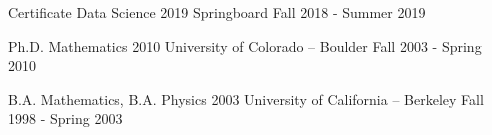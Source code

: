 

\begin{cventries}

  \cventry
    {Certificate Data Science 2019} %
    {Springboard} %
    {} %
    {Fall 2018 - Summer 2019} %
    {
    }
    \vspace{-5mm}

  \cventry
    {Ph.D. Mathematics 2010} %
    {University of Colorado -- Boulder} %
    {} %
    {Fall 2003 - Spring 2010} %
    {
    }
    \vspace{-5mm}

  \cventry
    {B.A. Mathematics, B.A. Physics 2003} %
    {University of California -- Berkeley} %
    {} %
    {Fall 1998 - Spring 2003} %
    {}
    \vspace{-5mm}
\end{cventries}
